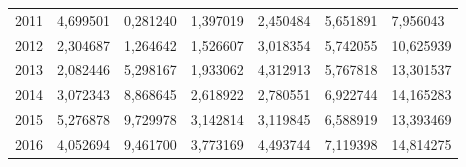 \begin{table}
\begin{tabular}{p{1cm}p{2cm}p{2cm}p{2cm}p{2cm}p{2cm}p{2cm}}
 2011 &                         4,699501 &                 0,281240 &        1,397019 &                                           2,450484 &   5,651891 &  7,956043 \\
 2012 &                         2,304687 &                 1,264642 &        1,526607 &                                           3,018354 &   5,742055 & 10,625939 \\
 2013 &                         2,082446 &                 5,298167 &        1,933062 &                                           4,312913 &   5,767818 & 13,301537 \\
 2014 &                         3,072343 &                 8,868645 &        2,618922 &                                           2,780551 &   6,922744 & 14,165283 \\
 2015 &                         5,276878 &                 9,729978 &        3,142814 &                                           3,119845 &   6,588919 & 13,393469 \\
 2016 &                         4,052694 &                 9,461700 &        3,773169 &                                           4,493744 &   7,119398 & 14,814275 \\
\bottomrule
\end{tabular}
\end{table}
